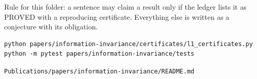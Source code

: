 Rule for this folder: a sentence may claim a result only if the ledger lists it as PROVED with a reproducing certificate. Everything else is written as a conjecture with its obligation.

\begin{verbatim}
python papers/information-invariance/certificates/l1_certificates.py
python -m pytest papers/information-invariance/tests
\end{verbatim}

\begin{flushright}\small\texttt{Publications/papers/information-invariance/README.md}\end{flushright}
